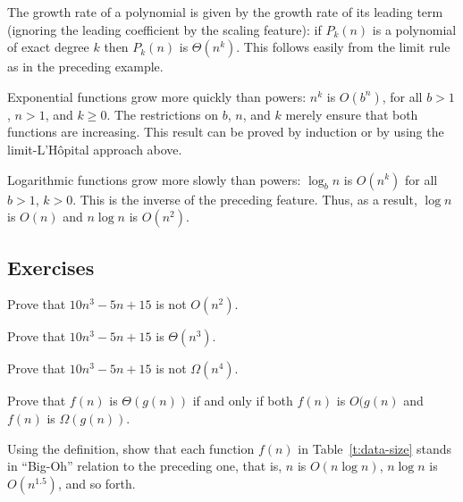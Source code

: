 \begin{Example}  
The growth rate of a polynomial is given by the growth rate of its leading 
term (ignoring the leading coefficient by the scaling feature): 
if $P_{k}(n)$ is a polynomial of exact degree $k$ then $P_{k}(n)$ is $\Theta(n^{k})$. 
This follows easily from the limit rule as in the preceding example.
\end{Example}


\begin{Example}  
Exponential functions grow more quickly than powers: 
$n^{k}$ is $O(b^{n})$, for all $b>1$, $n>1$, and $k \ge 0$. 
The restrictions on $b$, $n$, and $k$ merely ensure that both 
functions are increasing. This result can be proved by induction or by using the 
limit-L'H\^{o}pital approach above.
\end{Example}

\begin{Example}  
Logarithmic functions grow more slowly than powers: 
$\log_{b} n$ is $O(n^{k})$ for all $b>1$, $k > 0$. 
This is the inverse of the preceding feature. Thus, 
as a result, $\log n$ is $O(n)$ and $n \log n$ is $O(n^{2})$.  
\end{Example} 

\subsection*{Exercises}

\begin{Exercise}\label{exr:aa:bigO:a}
Prove that $10n^3 - 5n + 15$ is not $O(n^{2})$.
\end{Exercise}
\begin{Exercise}\label{exr:aa:bigO:b}
Prove that $10n^3 - 5n + 15$ is $\Theta(n^{3})$.
\end{Exercise}
\begin{Exercise}\label{exr:aa:bigO:c}
Prove that $10n^3 - 5n + 15$ is not $\Omega(n^{4})$.
\end{Exercise}

\begin{Exercise}\label{exr:bigtheta}
Prove that $f(n)$ is $\Theta(g(n))$ if and only if both $f(n)$ is $O(g(n)$ and 
$f(n)$ is $\Omega(g(n))$.
\end{Exercise}

\begin{Exercise}
\label{exr:bigoh-order}
Using the definition, show that each function \(f(n)\) in 
Table~\ref{t:data-size} stands in ``Big-Oh'' relation to the preceding 
one, that is, \(n\) is \(O(n\log n)\), \(n\log n\) is \(O(n^{1.5})\),
and so forth. 

\end{Exercise}

